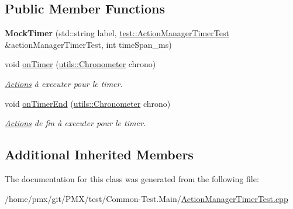 \subsection*{Public Member Functions}
\begin{DoxyCompactItemize}
\item 
\mbox{\label{classMockTimer_a6e15440a3ea2c8d58c98c9a3930fee61}} 
{\bfseries Mock\+Timer} (std\+::string label, \hyperlink{classtest_1_1ActionManagerTimerTest}{test\+::\+Action\+Manager\+Timer\+Test} \&action\+Manager\+Timer\+Test, int time\+Span\+\_\+ms)
\item 
\mbox{\label{classMockTimer_ab27dbe205304fa9f8ea18483b913b3ad}} 
void \hyperlink{classMockTimer_ab27dbe205304fa9f8ea18483b913b3ad}{on\+Timer} (\hyperlink{classutils_1_1Chronometer}{utils\+::\+Chronometer} chrono)
\begin{DoxyCompactList}\small\item\em \hyperlink{classActions}{Actions} à executer pour le timer. \end{DoxyCompactList}\item 
\mbox{\label{classMockTimer_ac01d1b1a9937f862b3c7669fc31e0db7}} 
void \hyperlink{classMockTimer_ac01d1b1a9937f862b3c7669fc31e0db7}{on\+Timer\+End} (\hyperlink{classutils_1_1Chronometer}{utils\+::\+Chronometer} chrono)
\begin{DoxyCompactList}\small\item\em \hyperlink{classActions}{Actions} de fin à executer pour le timer. \end{DoxyCompactList}\end{DoxyCompactItemize}
\subsection*{Additional Inherited Members}


The documentation for this class was generated from the following file\+:\begin{DoxyCompactItemize}
\item 
/home/pmx/git/\+P\+M\+X/test/\+Common-\/\+Test.\+Main/\hyperlink{ActionManagerTimerTest_8cpp}{Action\+Manager\+Timer\+Test.\+cpp}\end{DoxyCompactItemize}
